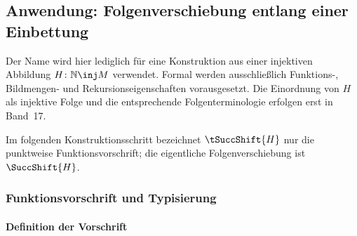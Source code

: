 \documentclass[main.tex]{subfiles}
\begin{document}
\begin{tabproof}



\end{tabproof}
\subsection{Anwendung: Folgenverschiebung entlang einer Einbettung}

Der Name wird hier lediglich für eine Konstruktion aus einer injektiven
Abbildung \(H\colon\mathbb N\inj M\) verwendet. Formal werden ausschließlich
Funktions-, Bildmengen- und Rekursionseigenschaften vorausgesetzt. Die
Einordnung von \(H\) als injektive Folge und die entsprechende
Folgenterminologie erfolgen erst in Band~17.

Im folgenden Konstruktionsschritt bezeichnet \(\tSuccShift{H}\) nur die
punktweise Funktionsvorschrift; die eigentliche Folgenverschiebung ist
\(\SuccShift{H}\).

\subsubsection{Funktionsvorschrift und Typisierung}

\paragraph{Definition der Vorschrift}
\end{document}
